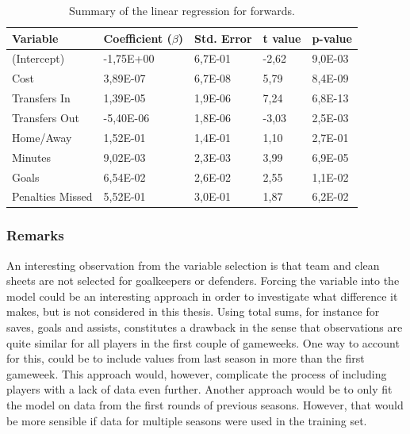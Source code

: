\begin{table}[H]
\centering
\begin{tabular}{|l|l|l|l|l|}
\hline
Variable         & Coefficient ($\beta$)  & Std. Error & t value & p-value \\ \hline
(Intercept)      & -1,75E+00 & 6,7E-01    & -2,62   & 9,0E-03 \\
Cost             & 3,89E-07  & 6,7E-08    & 5,79    & 8,4E-09 \\
Transfers In     & 1,39E-05  & 1,9E-06    & 7,24    & 6,8E-13 \\
Transfers Out    & -5,40E-06 & 1,8E-06    & -3,03   & 2,5E-03 \\
Home/Away        & 1,52E-01  & 1,4E-01    & 1,10    & 2,7E-01 \\
Minutes          & 9,02E-03  & 2,3E-03    & 3,99    & 6,9E-05 \\
Goals            & 6,54E-02  & 2,6E-02    & 2,55    & 1,1E-02 \\
Penalties Missed & 5,52E-01  & 3,0E-01    & 1,87    & 6,2E-02 \\
\hline
\end{tabular}
\caption{Summary of the linear regression for forwards.}
\label{tab:coef_FWD}
\end{table}

\subsubsection{Remarks}

An interesting observation from the variable selection is that team and clean sheets are not selected for goalkeepers or defenders. Forcing the variable into the model could be an interesting approach in order to investigate what difference it makes, but is not considered in this thesis. Using total sums, for instance for saves, goals and assists, constitutes a drawback in the sense that observations are quite similar for all players in the first couple of gameweeks. One way to account for this, could be to include values from last season in more than the first gameweek. This approach would, however, complicate the process of  including players with a lack of data even further. Another approach would be to only fit the model on data from the first rounds of previous seasons. However, that would be more sensible if data for multiple seasons were used in the training set.

